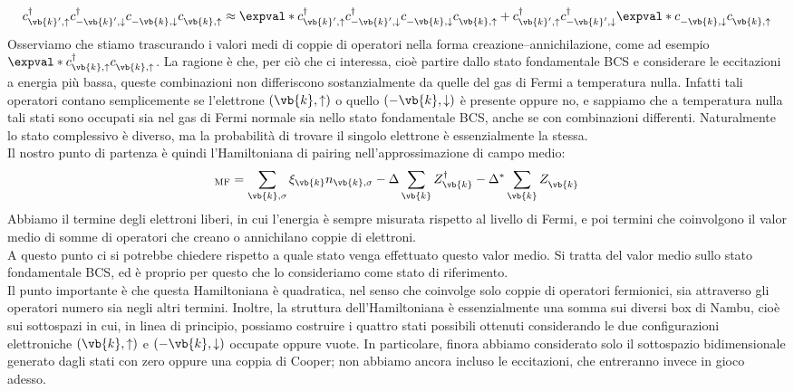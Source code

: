 \begin{equation*}
   c^{\dag}_{\vb{k}',\uparrow}
   c^{\dag}_{-\vb{k}',\downarrow}
   c^{\vphantom{\dag}}_{-\vb{k},\downarrow}
   c^{\vphantom{\dag}}_{\vb{k},\uparrow}
   \approx
   \expval*{
      c^{\dag}_{\vb{k}',\uparrow}
      c^{\dag}_{-\vb{k}',\downarrow}
   }
   c^{\vphantom{\dag}}_{-\vb{k},\downarrow}
   c^{\vphantom{\dag}}_{\vb{k},\uparrow}
   +
   c^{\dag}_{\vb{k}',\uparrow}
   c^{\dag}_{-\vb{k}',\downarrow}
   \expval*{
      c^{\vphantom{\dag}}_{-\vb{k},\downarrow}
      c^{\vphantom{\dag}}_{\vb{k},\uparrow}
   }
\end{equation*}
Osserviamo che stiamo trascurando i valori medi di coppie di operatori nella forma creazione--annichilazione, come ad esempio $\expval*{
c^{\dag}_{\vb{k},\uparrow}
c^{\vphantom{\dag}}_{\vb{k},\uparrow}
}$. La ragione è che, per ciò che ci interessa, cioè partire dallo stato fondamentale BCS e considerare le eccitazioni a energia più bassa, queste combinazioni non differiscono sostanzialmente da quelle del gas di Fermi a temperatura nulla. Infatti tali operatori contano semplicemente se l'elettrone $(\vb{k},\uparrow)$ o quello $(-\vb{k},\downarrow)$ è presente oppure no, e sappiamo che a temperatura nulla tali stati sono occupati sia nel gas di Fermi normale sia nello stato fondamentale BCS, anche se con combinazioni differenti. Naturalmente lo stato complessivo è diverso, ma la probabilità di trovare il singolo elettrone è essenzialmente la stessa.\\
Il nostro punto di partenza è quindi l'Hamiltoniana di pairing nell'approssimazione di campo medio:
\begin{equation*}
   [H - \mu N]_{\rm MF}
   =
   \sum_{\vb{k},\sigma}
   \xi_{\vb{k}}
   n_{\vb{k},\sigma}
   -
   \Delta
   \sum_{\vb{k}}
   Z^{\dag}_{\vb{k}}
   -
   \Delta^*
   \sum_{\vb{k}}
   Z^{\vphantom{\dag}}_{\vb{k}}
\end{equation*}
Abbiamo il termine degli elettroni liberi, in cui l'energia è sempre misurata rispetto al livello di Fermi, e poi termini che coinvolgono il valor medio di somme di operatori che creano o annichilano coppie di elettroni.\\
A questo punto ci si potrebbe chiedere rispetto a quale stato venga effettuato questo valor medio. Si tratta del valor medio sullo stato fondamentale BCS, ed è proprio per questo che lo consideriamo come stato di riferimento.\\
Il punto importante è che questa Hamiltoniana è quadratica, nel senso che coinvolge solo coppie di operatori fermionici, sia attraverso gli operatori numero sia negli altri termini. Inoltre, la struttura dell'Hamiltoniana è essenzialmente una somma sui diversi box di Nambu, cioè sui sottospazi in cui, in linea di principio, possiamo costruire i quattro stati possibili ottenuti considerando le due configurazioni elettroniche $(\vb{k},\uparrow)$ e $(-\vb{k},\downarrow)$ occupate oppure vuote. In particolare, finora abbiamo considerato solo il sottospazio bidimensionale generato dagli stati con zero oppure una coppia di Cooper; non abbiamo ancora incluso le eccitazioni, che entreranno invece in gioco adesso.\\
